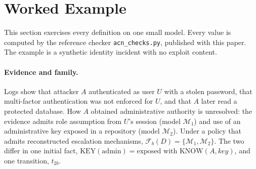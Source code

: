 \documentclass[11pt,letterpaper]{article}
\theoremstyle{definition}
\newcommand{\Fam}{\mathcal{F}}
\newcommand{\Mod}{\mathcal{M}}
\begin{document}
\section{Worked Example}\label{sec:example}

This section exercises every definition on one small model. Every value is computed by the reference checker \texttt{acn\_checks.py}, published with this paper. The example is a synthetic identity incident with no exploit content.

\paragraph{Evidence and family.} Logs show that attacker $A$ authenticated as user $U$ with a stolen password, that multi-factor authentication was not enforced for $U$, and that $A$ later read a protected database. How $A$ obtained administrative authority is unresolved: the evidence admits role assumption from $U$'s session (model $\Mod_1$) and use of an administrative key exposed in a repository (model $\Mod_2$). Under a policy that admits reconstructed escalation mechanisms, $\Fam_b(D)=\{\Mod_1,\Mod_2\}$. The two differ in one initial fact, $\mathrm{KEY}(\mathrm{admin})=\mathrm{exposed}$ with $\mathrm{KNOW}(A,\mathit{key})$, and one transition, $t_{2b}$.
\end{document}
